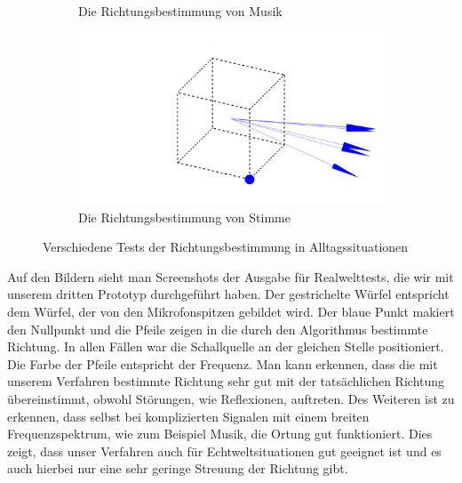 \begin{figure}[H]
\begin{subfigure}[b]{0.475\textwidth}
    \caption{Die Richtungsbestimmung von Musik\label{fig:music}}
  \end{subfigure}
  \hfill
  \begin{subfigure}[b]{0.475\textwidth}
    \centering
    \includegraphics[width=\textwidth]{img/sprechen.png}
    \caption{Die Richtungsbestimmung von Stimme\label{fig:speech}}
  \end{subfigure}

  \caption{Verschiedene Tests der Richtungsbestimmung in Alltagssituationen\label{fig:tests}}
\end{figure}
Auf den Bildern sieht man Screenshots der Ausgabe für Realwelttests, die wir mit unserem dritten Prototyp durchgeführt haben. Der gestrichelte Würfel entspricht dem Würfel, der von den Mikrofonspitzen gebildet wird. Der blaue Punkt makiert den Nullpunkt und die Pfeile zeigen in die durch den Algorithmus bestimmte Richtung. In allen Fällen war die Schallquelle an der gleichen Stelle positioniert. Die Farbe der Pfeile entspricht der Frequenz. Man kann erkennen, dass die mit unserem Verfahren bestimmte Richtung sehr gut mit der tatsächlichen Richtung übereinstimmt, obwohl Störungen, wie Reflexionen, auftreten. Des Weiteren ist zu erkennen, dass selbst bei komplizierten Signalen mit einem breiten Frequenzspektrum, wie zum Beispiel Musik, die Ortung gut funktioniert. Dies zeigt, dass unser Verfahren auch für Echtweltsituationen gut geeignet ist und es auch hierbei nur eine sehr geringe Streuung der Richtung gibt.